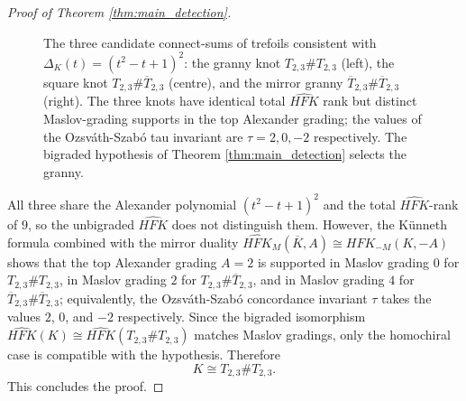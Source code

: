 \begin{proof}[Proof of Theorem \ref{thm:main_detection}]
\begin{figure}[ht]
\centering
{}
\caption[Three connect-sums of trefoils with Alexander polynomial $(t^2-t+1)^2$]{%
The three candidate connect-sums of trefoils consistent with $\Delta_K(t)=(t^2-t+1)^2$: the granny knot $T_{2,3} \# T_{2,3}$ (left), the square knot $T_{2,3} \# \overline{T}_{2,3}$ (centre), and the mirror granny $\overline{T}_{2,3} \# \overline{T}_{2,3}$ (right). The three knots have identical total $\widehat{HFK}$ rank but distinct Maslov-grading supports in the top Alexander grading; the values of the Ozsv\'{a}th-Szab\'{o} tau invariant are $\tau = 2, 0, -2$ respectively. The bigraded hypothesis of Theorem \ref{thm:main_detection} selects the granny.}
\label{fig:three_candidates}
\end{figure}

All three share the Alexander polynomial $(t^2-t+1)^2$ and the total $\widehat{HFK}$-rank of $9$, so the unbigraded $\widehat{HFK}$ does not distinguish them. However, the K\"{u}nneth formula combined with the mirror duality $\widehat{HFK}_M(\overline{K}, A) \cong \widehat{HFK}_{-M}(K, -A)$ \cite{OS04Knot} shows that the top Alexander grading $A = 2$ is supported in Maslov grading $0$ for $T_{2,3}\# T_{2,3}$, in Maslov grading $2$ for $T_{2,3}\#\overline{T}_{2,3}$, and in Maslov grading $4$ for $\overline{T}_{2,3}\#\overline{T}_{2,3}$; equivalently, the Ozsv\'{a}th-Szab\'{o} concordance invariant $\tau$ takes the values $2$, $0$, and $-2$ respectively. Since the bigraded isomorphism $\widehat{HFK}(K) \cong \widehat{HFK}(T_{2,3}\# T_{2,3})$ matches Maslov gradings, only the homochiral case is compatible with the hypothesis. Therefore
\[
K \cong T_{2,3} \# T_{2,3}.
\]
This concludes the proof.
\end{proof}

